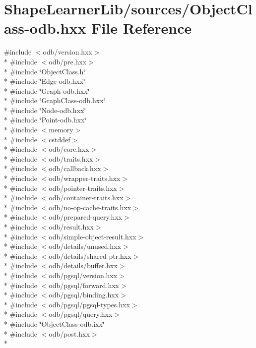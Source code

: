 \hypertarget{_object_class-odb_8hxx}{}\section{Shape\+Learner\+Lib/sources/\+Object\+Class-\/odb.hxx File Reference}
\label{_object_class-odb_8hxx}
{\ttfamily \#include $<$odb/version.\+hxx$>$}\\*
{\ttfamily \#include $<$odb/pre.\+hxx$>$}\\*
{\ttfamily \#include \char`\"{}Object\+Class.\+h\char`\"{}}\\*
{\ttfamily \#include \char`\"{}Edge-\/odb.\+hxx\char`\"{}}\\*
{\ttfamily \#include \char`\"{}Graph-\/odb.\+hxx\char`\"{}}\\*
{\ttfamily \#include \char`\"{}Graph\+Class-\/odb.\+hxx\char`\"{}}\\*
{\ttfamily \#include \char`\"{}Node-\/odb.\+hxx\char`\"{}}\\*
{\ttfamily \#include \char`\"{}Point-\/odb.\+hxx\char`\"{}}\\*
{\ttfamily \#include $<$memory$>$}\\*
{\ttfamily \#include $<$cstddef$>$}\\*
{\ttfamily \#include $<$odb/core.\+hxx$>$}\\*
{\ttfamily \#include $<$odb/traits.\+hxx$>$}\\*
{\ttfamily \#include $<$odb/callback.\+hxx$>$}\\*
{\ttfamily \#include $<$odb/wrapper-\/traits.\+hxx$>$}\\*
{\ttfamily \#include $<$odb/pointer-\/traits.\+hxx$>$}\\*
{\ttfamily \#include $<$odb/container-\/traits.\+hxx$>$}\\*
{\ttfamily \#include $<$odb/no-\/op-\/cache-\/traits.\+hxx$>$}\\*
{\ttfamily \#include $<$odb/prepared-\/query.\+hxx$>$}\\*
{\ttfamily \#include $<$odb/result.\+hxx$>$}\\*
{\ttfamily \#include $<$odb/simple-\/object-\/result.\+hxx$>$}\\*
{\ttfamily \#include $<$odb/details/unused.\+hxx$>$}\\*
{\ttfamily \#include $<$odb/details/shared-\/ptr.\+hxx$>$}\\*
{\ttfamily \#include $<$odb/details/buffer.\+hxx$>$}\\*
{\ttfamily \#include $<$odb/pgsql/version.\+hxx$>$}\\*
{\ttfamily \#include $<$odb/pgsql/forward.\+hxx$>$}\\*
{\ttfamily \#include $<$odb/pgsql/binding.\+hxx$>$}\\*
{\ttfamily \#include $<$odb/pgsql/pgsql-\/types.\+hxx$>$}\\*
{\ttfamily \#include $<$odb/pgsql/query.\+hxx$>$}\\*
{\ttfamily \#include \char`\"{}Object\+Class-\/odb.\+ixx\char`\"{}}\\*
{\ttfamily \#include $<$odb/post.\+hxx$>$}\\*
